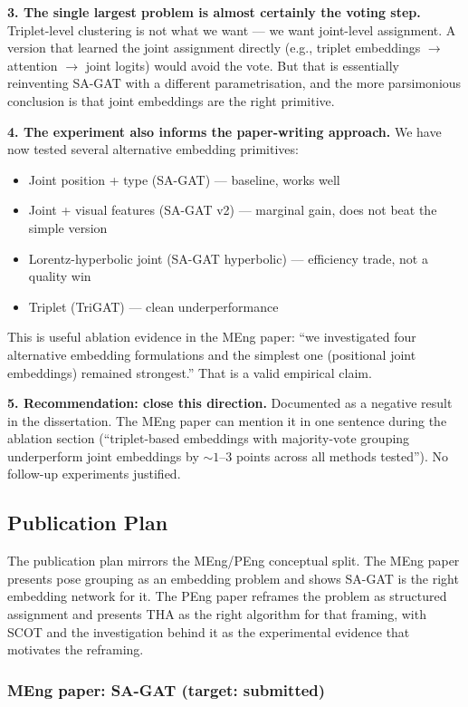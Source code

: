 \textbf{3. The single largest problem is almost certainly the voting step.} Triplet-level clustering is not what we want --- we want joint-level assignment. A version that learned the joint assignment directly (e.g., triplet embeddings $\to$ attention $\to$ joint logits) would avoid the vote. But that is essentially reinventing SA-GAT with a different parametrisation, and the more parsimonious conclusion is that joint embeddings are the right primitive.

\textbf{4. The experiment also informs the paper-writing approach.} We have now tested several alternative embedding primitives:
\begin{itemize}
    \item Joint position + type (SA-GAT) --- baseline, works well
    \item Joint + visual features (SA-GAT v2) --- marginal gain, does not beat the simple version
    \item Lorentz-hyperbolic joint (SA-GAT hyperbolic) --- efficiency trade, not a quality win
    \item Triplet (TriGAT) --- clean underperformance
\end{itemize}
This is useful ablation evidence in the MEng paper: ``we investigated four alternative embedding formulations and the simplest one (positional joint embeddings) remained strongest.'' That is a valid empirical claim.

\textbf{5. Recommendation: close this direction.} Documented as a negative result in the dissertation. The MEng paper can mention it in one sentence during the ablation section (``triplet-based embeddings with majority-vote grouping underperform joint embeddings by $\sim 1$--$3$ points across all methods tested''). No follow-up experiments justified.


\subsection{Publication Plan}

The publication plan mirrors the MEng/PEng conceptual split. The MEng paper presents pose grouping as an embedding problem and shows SA-GAT is the right embedding network for it. The PEng paper reframes the problem as structured assignment and presents THA as the right algorithm for that framing, with SCOT and the investigation behind it as the experimental evidence that motivates the reframing.

\subsubsection{MEng paper: SA-GAT (target: submitted)}

